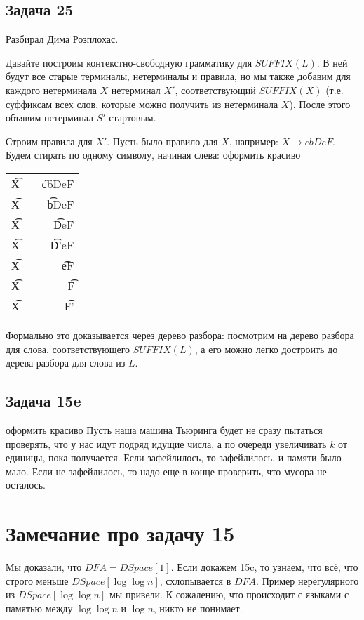 \subsection{Задача 25}
	Разбирал Дима Розплохас.

	Давайте построим контекстно-свободную грамматику для $SUFFIX(L)$.
	В ней будут все старые терминалы, нетерминалы и правила, но мы также
	добавим для каждого нетерминала $X$ нетерминал $X'$, соответствующий $SUFFIX(X)$
	(т.е. суффиксам всех слов, которые можно получить из нетерминала $X$).
	После этого объявим нетерминал $S'$ стартовым.

	Строим правила для $X'$.
	Пусть было правило для $X$, например: $X \to cbDeF$.
	Будем стирать по одному символу, начиная слева:
	\TODO оформить красиво
	\begin{tabular}{rcr}
		\t{X} &\to& \t{cbDeF} \\
		\t{X} &\to&  \t{bDeF} \\
		\t{X} &\to&   \t{DeF} \\
		\t{X} &\to&  \t{D'eF} \\
		\t{X} &\to&    \t{eF} \\
		\t{X} &\to&     \t{F} \\
		\t{X} &\to&    \t{F'} \\
	\end{tabular}
	Формально это доказывается через дерево разбора: посмотрим на дерево разбора для слова,
	соответствующего $SUFFIX(L)$, а его можно легко достроить до дерева разбора для слова из $L$.

\subsection{Задача 15e}
	\TODO оформить красиво
	Пусть наша машина Тьюринга будет не сразу пытаться проверять, что у нас идут подряд идущие числа,
	а по очереди увеличивать $k$ от единицы, пока получается.
	Если зафейлилось, то зафейлилось, и памяти было мало.
	Если не зафейлилось, то надо еще в конце проверить, что мусора не осталось.

\section{Замечание про задачу 15}
	Мы доказали, что $DFA=DSpace[1]$.
	Если докажем 15c, то узнаем, что всё, что строго меньше $DSpace[\log \log n]$,
	схлопывается в $DFA$.
	Пример нерегулярного из $DSpace[\log \log n]$ мы привели.
	К сожалению, что происходит с языками с памятью между $\log \log n$ и $\log n$, никто не понимает.
